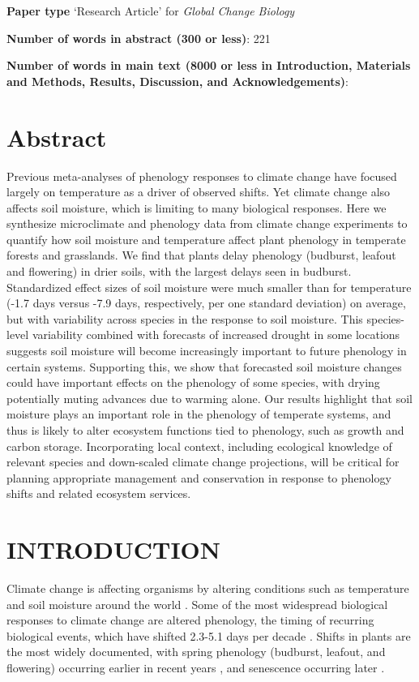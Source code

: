\documentclass{article}
\begin{document}
\textbf{Paper type} `Research Article' for \textit{Global Change Biology} %

\textbf{Number of words in abstract (300 or less)}: 221 

\textbf{Number of words in main text (8000 or less in Introduction, Materials and Methods, Results, Discussion, and Acknowledgements)}: 




\linenumbers

\section*{Abstract} 
Previous meta-analyses of phenology responses to climate change have focused largely on temperature as a driver of observed shifts. Yet climate change also affects soil moisture, which is limiting to many biological responses. Here we synthesize microclimate and phenology data from climate change experiments to quantify how soil moisture and temperature affect plant phenology in temperate forests and grasslands. We find that plants delay phenology (budburst, leafout and flowering) in drier soils, with the largest delays seen in budburst. Standardized effect sizes of soil moisture were much smaller than for temperature (-1.7 days versus -7.9 days, respectively, per one standard deviation) on average, but with variability across species in the response to soil moisture. This species-level variability combined with forecasts of increased drought in some locations suggests soil moisture will become increasingly important to future phenology in certain systems. Supporting this, we show that forecasted soil moisture changes could have important effects on the phenology of some species, with drying potentially muting advances due to warming alone. Our results highlight that soil moisture plays an important role in the phenology of temperate systems, and thus is likely to alter ecosystem functions tied to phenology, such as growth and carbon storage. Incorporating local context, including ecological knowledge of relevant species and down-scaled climate change projections, will be critical for planning appropriate management and conservation in response to phenology shifts and related ecosystem services.

\newpage
\section* {INTRODUCTION} 
\par Climate change is affecting organisms by altering conditions such as temperature and soil moisture around the world \citep{parmesan2006,chen2011}. Some of the most widespread biological responses to climate change are altered phenology, the timing of recurring biological events, which have shifted 2.3-5.1 days per decade \citep{parmesan2006,poloczanska2013,root2003}. Shifts in plants are the most widely documented, with spring phenology (budburst, leafout, and flowering) occurring earlier in recent years \citep{wolkovich2012}, and senescence occurring later \citep{taylor2008,delpierre2009}. 
\end{document}
